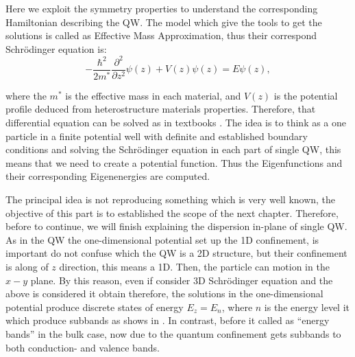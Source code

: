 Here we exploit the symmetry properties to understand the corresponding Hamiltonian describing the \gls{QW}.
The model which give the tools to get the solutions is called as Effective Mass Approximation, thus their correspond Schrödinger equation is\cite{harrison2016quantum,chuang1995physics,singh2003electronic,bastard1990wave,fox2002optical,davies1998physics}: 
\begin{equation}\label{eq:chapter-1-ema-schroedinger}
	-\dfrac{\hbar^{2}}{2m^{*}}\dfrac{\partial^{2}}{\partial {z}^{2}}\psi(z)+V(z)\psi(z)=E\psi(z),
\end{equation}

where the $m^{*}$ is the effective mass in each material, and $V(z)$ is the potential profile deduced from  heterostructure materials properties. Therefore, that differential equation can be solved as in textbooks \cite{de2014introduccion,griffiths2018introduction,sakurai1995modern,cohen2019quantum,chuang1995physics,harrison2016quantum,fox2002optical,bastard1990wave}. The idea is to think as a one particle in a finite potential well with definite and established  boundary conditions and solving the Schrödinger equation in each part of single \gls{QW}, this means that we need to create a potential function. Thus the Eigenfunctions and their corresponding Eigenenergies are computed.

The principal idea is not reproducing something which is very well known, the objective of this part is to established the scope of the next chapter. Therefore,  before to continue, we will finish explaining the dispersion in-plane of single \gls{QW}. As in the \gls{QW} the one-dimensional potential set up the 1D confinement, is important do not confuse which the \gls{QW} is a 2D structure, but their confinement is along of $z$ direction, this means a 1D. Then, the particle can motion in the $x-y$ plane. By this reason, even if consider 3D Schrödinger equation and  the above is considered it obtain 
therefore, the solutions in the one-dimensional potential produce discrete states of energy $E_{z}=E_{n}$\cite{harrison2016quantum}, where $n$ is the energy level it which produce  subbands as shows in . In contrast, before it called as ``energy bands'' in the bulk case, now due to the quantum confinement gets subbands to both conduction- and valence bands.

